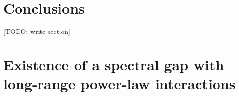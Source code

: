 \documentclass[nofootinbib,notitlepage,11pt]{revtex4-2}
\newcommand{\1}{\mathds{1}}
\newcommand{\red}[1]{{\color{red} #1}}
\begin{document}
\section{Conclusions}
\label{sec:conclusions}


\red{[TODO: write section]}



\newpage
\appendix

\section{Existence of a spectral gap with long-range power-law
  interactions}
\label{sec:spectral_gap}
\end{document}
